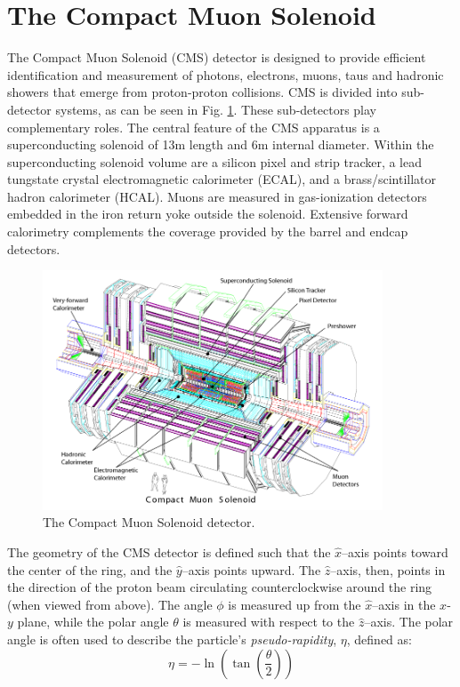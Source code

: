 \section{The Compact Muon Solenoid}

The Compact Muon Solenoid (CMS) detector is designed to provide efficient identification and 
measurement of photons, electrons, muons, taus and hadronic showers that emerge
from proton-proton collisions.
CMS is divided into sub-detector systems, as can be seen in Fig. \ref{fig:cms_complete}.
These sub-detectors play complementary roles.
The central feature of the CMS apparatus is a superconducting solenoid of 13\unit{m} length and 6\unit{m} internal diameter. Within the superconducting solenoid volume are a silicon pixel and strip tracker, a lead tungstate crystal electromagnetic calorimeter (ECAL), and a brass/scintillator hadron calorimeter (HCAL). Muons are measured in gas-ionization detectors embedded in the iron return yoke outside the solenoid. Extensive forward calorimetry complements the coverage provided by the barrel and endcap detectors. 
\begin{figure}[htbp] 
\centering
\includegraphics[width=0.9\textwidth]{plots/intro/cms_complete.png}
\caption{The Compact Muon Solenoid detector.\label{fig:cms_complete}}
\end{figure}

The geometry of the CMS detector is defined such that the $\hat{x}$--axis points toward the
center of the ring, and the $\hat{y}$--axis points upward. The $\hat{z}$--axis, then, points in
the direction of the proton beam circulating counterclockwise around the ring (when viewed
from above). The angle $\phi$ is measured up from the $\hat{x}$--axis in the $x$-$y$ plane, while
the polar angle $\theta$ is measured with respect to the $\hat{z}$--axis. The polar angle is often used to describe
the particle's {\it pseudo-rapidity}, $\eta$, defined as:
\begin{equation}
\eta = -\ln\left(\tan\left(\frac{\theta}{2}\right)\right)
\end{equation}

